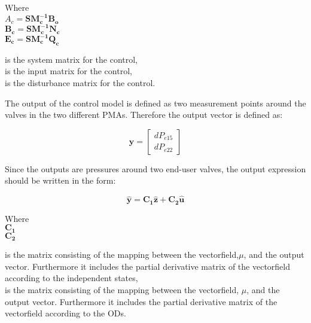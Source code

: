 \begin{minipage}[t]{0.40\textwidth}
Where\\
\hspace*{8mm} $A_c = \pmb{S}\pmb{M_c^{-1}}\pmb{B_o} $ \\
\hspace*{8mm} $\pmb{B_c} = \pmb{S}\pmb{M_c^{-1}}\pmb{N_c} $ \\
\hspace*{8mm} $\pmb{E_c} = \pmb{S}\pmb{M_c^{-1}}\pmb{Q_c} $
\end{minipage}
\begin{minipage}[t]{0.48\textwidth}
\vspace*{1mm}
is the system matrix for the control, \\
is the input matrix for the control, \\
is the disturbance matrix for the control.
\end{minipage} 

The output of the control model is defined as two measurement points around the valves in the two different PMAs. Therefore the output vector is defined as: 

\begin{equation}
\pmb{y} =
\begin{bmatrix} 
dP_{e15} \\
dP_{e22} 
\label{outputvector_control}
\end{bmatrix} 
\end{equation}

Since the outputs are pressures around two end-user valves, the output expression should be written in the form:

\begin{equation}
  \pmb{\hat{y}} = \pmb{C_1} \pmb{\hat{z}} + \pmb{C_2} \pmb{\hat{u}}  
   \label{statespace_control_output}
\end{equation}

\begin{minipage}[t]{0.20\textwidth}
Where\\
\hspace*{8mm} $\pmb{C_1}$ \\
\newline
\newline
\newline
\hspace*{8mm} $\pmb{C_2}$ 
\end{minipage}
\begin{minipage}[t]{0.68\textwidth}
\vspace*{2mm}
is the matrix consisting of the mapping between the vectorfield,$\mu$, and the output vector. Furthermore it includes the partial derivative matrix of the vectorfield according to the independent states, \\
is the matrix consisting of the mapping between the vectorfield, $\mu$, and the output vector. Furthermore it includes the partial derivative matrix of the vectorfield according to the ODs.
\end{minipage}

